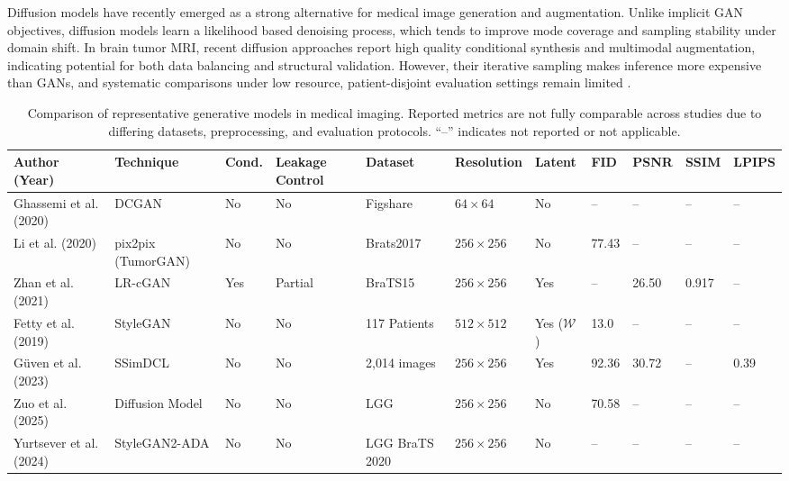 Diffusion models \cite{zuo2025multichannel} have recently emerged as a strong alternative for medical image generation and augmentation. Unlike implicit GAN objectives, diffusion models learn a likelihood based denoising process, which tends to improve mode coverage and sampling stability under domain shift. In brain tumor MRI, recent diffusion approaches report high quality conditional synthesis and multimodal augmentation, indicating potential for both data balancing and structural validation. However, their iterative sampling makes inference more expensive than GANs, and systematic comparisons under low resource, patient-disjoint evaluation settings remain limited \cite{abdullah2025computationallyefficientdiffusionmodels}.\\


\begin{table}[H]
\centering
\scriptsize
\setlength{\tabcolsep}{4pt}
\renewcommand{\arraystretch}{1.6}
\caption{Comparison of representative generative models in medical imaging. Reported metrics are not fully comparable across studies due to differing datasets, preprocessing, and evaluation protocols. ``--'' indicates not reported or not applicable.}
\begin{tabular}{|p{2.2cm}|p{1.8cm}|p{0.9cm}|p{1.4cm}|p{1.5cm}|p{1.7cm}|p{1cm}|p{0.8cm}|p{1cm}|p{1cm}|p{1cm}|}
\hline
\textbf{Author (Year)} & \textbf{Technique} & \textbf{Cond.} & \textbf{Leakage Control} & \textbf{Dataset} & \textbf{Resolution} & \textbf{Latent} & \textbf{FID} & \textbf{PSNR} & \textbf{SSIM} & \textbf{LPIPS} \\
\hline
Ghassemi et al. (2020) \cite{GHASSEMI2020101678} & DCGAN & No & No & Figshare & $64\times64$ & No & -- & -- & -- & -- \\
\hline
Li et al. (2020) \cite{li2020tumorgan} & pix2pix (TumorGAN) & No & No & Brats2017 & $256\times256$ & No & 77.43 & -- & -- & -- \\
\hline
Zhan et al. (2021) \cite{Zhan2021} & LR-cGAN & Yes & Partial & BraTS15 & $256\times256$ & Yes & -- & 26.50 & 0.917 & -- \\
\hline
Fetty et al. (2019) \cite{Fetty2020} & StyleGAN & No & No & 117 Patients & $512\times512$ & Yes ($\mathcal{W}$) & 13.0 & -- & -- & -- \\
\hline
Güven et al. (2023) \cite{Guven2023BrainMRI} & SSimDCL & No & No & 2,014 images & $256\times256$ & Yes & 92.36 & 30.72 & -- & 0.39 \\
\hline
Zuo et al. (2025) \cite{zuo2025multichannel} & Diffusion Model & No & No & LGG & $256\times256$ & No & 70.58 & -- & -- & -- \\
\hline
Yurtsever et al. (2024) \cite{yurtsever2024brain}  & StyleGAN2-ADA & No & No & LGG BraTS 2020 & $256\times256$ & No & -- & -- & -- & -- \\
\hline
\end{tabular}
\label{tab:generative_models}
\end{table}






